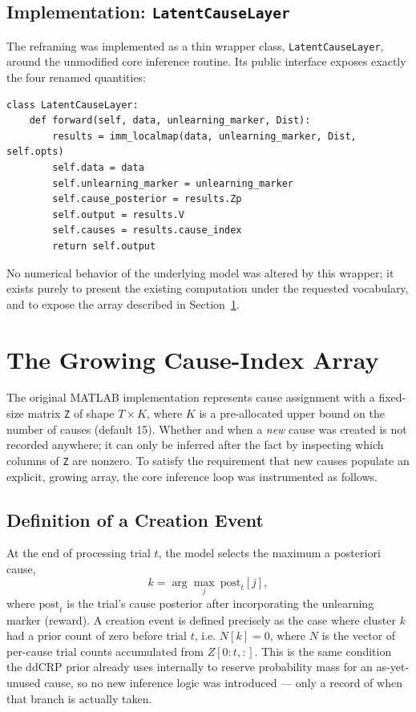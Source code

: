 \documentclass{surreydissertation}
\begin{document}
\subsection{Implementation: \texttt{LatentCauseLayer}}
 
The reframing was implemented as a thin wrapper class,
\texttt{LatentCauseLayer}, around the unmodified core inference routine.
Its public interface exposes exactly the four renamed quantities:
 
\begin{verbatim}
class LatentCauseLayer:
    def forward(self, data, unlearning_marker, Dist):
        results = imm_localmap(data, unlearning_marker, Dist, self.opts)
        self.data = data
        self.unlearning_marker = unlearning_marker
        self.cause_posterior = results.Zp
        self.output = results.V
        self.causes = results.cause_index
        return self.output
\end{verbatim}
 
No numerical behavior of the underlying model was altered by this wrapper;
it exists purely to present the existing computation under the requested
vocabulary, and to expose the array described in
Section~\ref{sec:causearray}.
 
\section{The Growing Cause-Index Array}
\label{sec:causearray}
 
The original MATLAB implementation represents cause assignment with a
fixed-size matrix \texttt{Z} of shape $T \times K$, where $K$ is a
pre-allocated upper bound on the number of causes (default 15). Whether and
when a \emph{new} cause was created is not recorded anywhere; it can only
be inferred after the fact by inspecting which columns of \texttt{Z} are
nonzero. To satisfy the requirement that new causes populate an explicit,
growing array, the core inference loop was instrumented as follows.
 
\subsection{Definition of a Creation Event}
 
At the end of processing trial $t$, the model selects the maximum a
posteriori cause,
\[
k = \arg\max_j \ \mathrm{post}_t[j],
\]
where $\mathrm{post}_t$ is the trial's cause posterior after incorporating
the unlearning marker (reward). A creation event is defined precisely as
the case where cluster $k$ had a prior count of zero before trial $t$,
i.e. $N[k] = 0$, where $N$ is the vector of per-cause trial counts
accumulated from $Z[0{:}t,:]$. This is the same condition the ddCRP prior
already uses internally to reserve probability mass for an as-yet-unused
cause, so no new inference logic was introduced --- only a record of when
that branch is actually taken.
 
\end{document}
